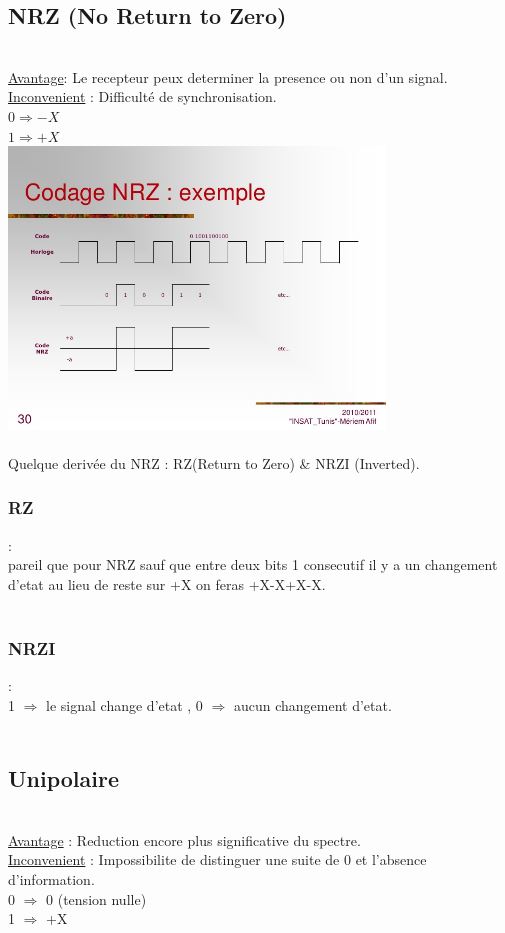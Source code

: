 \documentclass[a4paper,8pt,openany]{book}
\begin{document}
\subsection{NRZ (No Return to Zero)}\\
\underline{Avantage}: Le recepteur peux determiner la presence ou non d'un signal.\\
\underline{Inconvenient} : Difficult\'e de synchronisation.\\
$0 \Rightarrow -X$\\
$1 \Rightarrow +X$\\
\includegraphics[width=0.75\textwidth,center]{img/nrz.jpg}\\
\\
Quelque derivée du NRZ : RZ(Return to Zero) \& NRZI (Inverted).\\ 
\subsubsection{RZ} : \\
pareil que pour NRZ sauf que entre deux bits 1 consecutif il y a un changement d'etat au lieu de reste sur +X on feras +X-X+X-X.\\
\\
\subsubsection{NRZI} : \\
1 $\Rightarrow$ le signal change d'etat , 0 $\Rightarrow$ aucun changement d'etat.\\
\\
\subsection{Unipolaire}\\
\underline{Avantage} : Reduction encore plus significative du spectre.\\
\underline{Inconvenient} : Impossibilite de distinguer une suite de 0 et l'absence d'information.\\
0 $\Rightarrow$ 0 (tension nulle)\\
1 $\Rightarrow$ +X\\ 
\\
\end{document}
